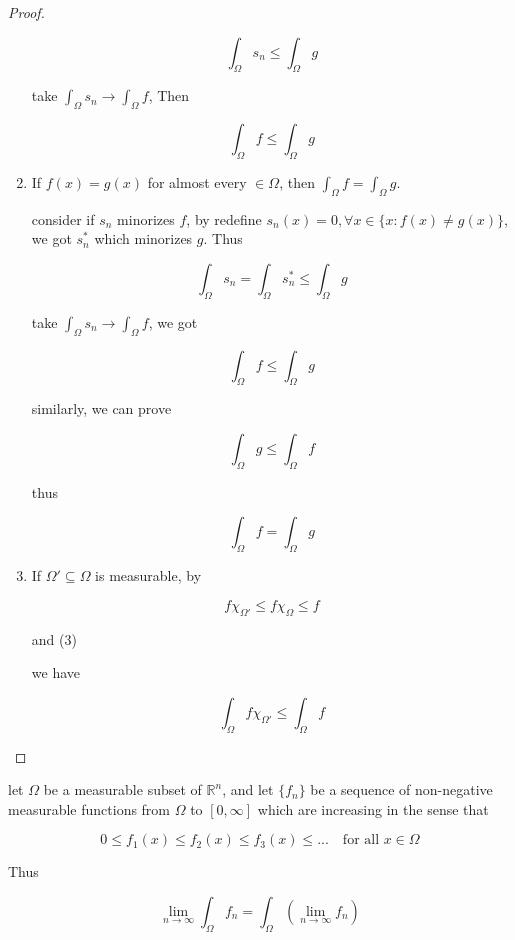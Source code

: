 \begin{proof}
\begin{enumerate}
        \[
            \int_{\Omega}s_n \le \int_{\Omega} g
        \]

        take $\int_{\Omega}s_n \to \int_{\Omega}f$, Then

        \[
            \int_{\Omega}f \le \int_{\Omega} g
        \]

        \item If $f (x)= g(x)$ for almost every $\in \Omega$, then $\int_{\Omega}f = \int_{\Omega} g$.

        consider if $s_n$ minorizes $f$, by redefine $s_n(x) = 0, \forall x \in \{x: f(x) \ne g(x)\}$,
        we got $s_n^*$ which minorizes $g$. Thus

        \[
            \int_{\Omega}s_n  = \int_{\Omega}s_n^* \le \int_{\Omega}g
        \]

        take $\int_{\Omega}s_n \to \int_{\Omega}f$, we got

        \[
          \int_{\Omega}f  \le \int_{\Omega}g
        \]

        similarly, we can prove


        \[
          \int_{\Omega}g  \le \int_{\Omega}f
        \]

        thus

        \[
          \int_{\Omega}f = \int_{\Omega}g
        \]


        \item If $\Omega' \subseteq \Omega$ is measurable, by 
        
        \[
        f\chi_{\Omega'} \le f\chi_{\Omega} \le f
        \]

        and (3)

        we have

        \[
            \int_{\Omega} f \chi_{\Omega'} \le \int_{\Omega} f
        \]
    \end{enumerate}
\end{proof}

\begin{thm}
    \label{thm:lebesgue-MCT-17b9b7af-2c23-4932-abc4-509e9a8e199f}
    let $\Omega$ be a measurable subset of $\mathbb{R}^n$, and let $\{ f_n \}$
    be a sequence of non-negative measurable functions from $\Omega $ to $[0,\infty]$
    which are increasing in the sense that

    \[
        0 \le f_1(x) \le f_2(x) \le f_3(x) \le ... \quad \text{for all } x \in \Omega
    \]

    Thus

    \[
        \lim_{n \to \infty}\int_{\Omega}f_n = \int_{\Omega} \left(\lim_{n \to \infty}f_n \right) 
    \]
\end{thm}

